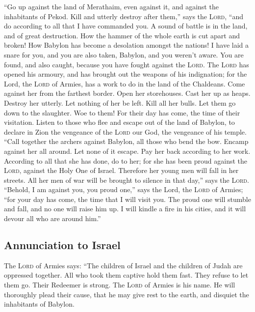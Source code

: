  ``Go up against the land of Merathaim, even against it,
and against the inhabitants of Pekod. Kill and utterly destroy after
them,'' says the \textsc{Lord}, ``and do according to all that I have
commanded you.  A sound of battle is in the land, and of
great destruction.  How the hammer of the whole earth is
cut apart and broken! How Babylon has become a desolation amongst the
nations!  I have laid a snare for you, and you are also
taken, Babylon, and you weren't aware. You are found, and also caught,
because you have fought against the \textsc{Lord}.  The
\textsc{Lord} has opened his armoury, and has brought out the weapons of
his indignation; for the Lord, the \textsc{Lord} of Armies, has a work
to do in the land of the Chaldeans.  Come against her
from the farthest border. Open her storehouses. Cast her up as heaps.
Destroy her utterly. Let nothing of her be left.  Kill
all her bulls. Let them go down to the slaughter. Woe to them! For their
day has come, the time of their visitation.  Listen to
those who flee and escape out of the land of Babylon, to declare in Zion
the vengeance of the \textsc{Lord} our God, the vengeance of his temple.
 ``Call together the archers against Babylon, all those
who bend the bow. Encamp against her all around. Let none of it escape.
Pay her back according to her work. According to all that she has done,
do to her; for she has been proud against the \textsc{Lord}, against the
Holy One of Israel.  Therefore her young men will fall in
her streets. All her men of war will be brought to silence in that
day,'' says the \textsc{Lord}.  ``Behold, I am against
you, you proud one,'' says the Lord, the \textsc{Lord} of Armies; ``for
your day has come, the time that I will visit you.  The
proud one will stumble and fall, and no one will raise him up. I will
kindle a fire in his cities, and it will devour all who are around
him.''

\hypertarget{annunciation-to-israel}{%
\subsection{Annunciation to Israel}\label{annunciation-to-israel}}

 The \textsc{Lord} of Armies says: ``The children of
Israel and the children of Judah are oppressed together. All who took
them captive hold them fast. They refuse to let them go. 
Their Redeemer is strong. The \textsc{Lord} of Armies is his name. He
will thoroughly plead their cause, that he may give rest to the earth,
and disquiet the inhabitants of Babylon.

